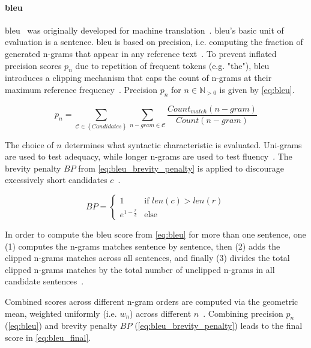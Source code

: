\paragraph{\ac{bleu}}
\ac{bleu}~\citep{papineni_bleu_2001} was originally developed for machine translation~\citep{zhou_paraphrase_2021,anantha_pearson_metrics_2021}. 
\ac{bleu}'s basic unit of evaluation is a sentence. 
\ac{bleu} is based on precision, i.e. computing the fraction of generated n-grams that appear in any reference text~\citep{kurt_pehlivanoglu_comparative_2024,palivela_optimization_2021,papineni_bleu_2001,anantha_pearson_metrics_2021}. 
To prevent inflated precision scores $p_n$ due to repetition of frequent tokens (e.g. "the"), \ac{bleu} introduces a clipping mechanism that caps the count of n-grams at their maximum reference frequency~\citep{papineni_bleu_2001}. 
Precision $p_n$ for $n \in \mathbb{N}_{>0}$ is given by \autoref{eq:bleu}.

\begin{equation}
    p_n = \sum_{\mathcal{C} \in \left\{ Candidates \right\}}\sum_{n-gram \in\mathcal{C}} \frac{Count_{match}(n-gram)}{Count(n-gram)}
\label{eq:bleu}
\end{equation}

The choice of $n$ determines what syntactic characteristic is evaluated.
Uni-grams are used to test adequacy, while longer n-grams are used to test fluency~\citep{papineni_bleu_2001}. 
The brevity penalty $BP$ from \autoref{eq:bleu_brevity_penalty} is applied to discourage excessively short candidates $c$~\citep{papineni_bleu_2001}.

\begin{equation}
    BP = \begin{cases}
        1 & \text{if } len(c) > len(r) \\
        e^{1 - \frac{r}{c}} & \text{else}
    \end{cases}
\label{eq:bleu_brevity_penalty}
\end{equation}

In order to compute the \ac{bleu} score from \autoref{eq:bleu} for more than one sentence, 
one (1) computes the n-grams matches sentence by sentence, 
then (2) adds the clipped n-grams matches across all sentences, 
and finally (3) divides the total clipped n-grams matches by 
the total number of unclipped n-grams in all candidate sentences~\citep{papineni_bleu_2001,cordeiro_bleu_2007}.

Combined scores across different n-gram orders are computed via the geometric mean, weighted uniformly (i.e. $w_n$) across different $n$~\citep{papineni_bleu_2001,banerjee_METEOR_2005}.
Combining precision $p_n$ (\autoref{eq:bleu}) and brevity penalty $BP$ (\autoref{eq:bleu_brevity_penalty}) leads to the final score in \autoref{eq:bleu_final}.

